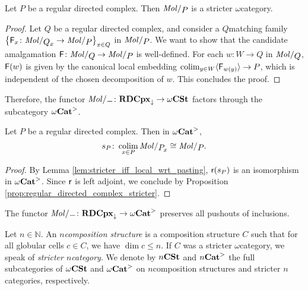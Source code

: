 \begin{prop} \label{prop:regular_directed_complex_stricter}
    Let \( P \) be a regular directed complex.
    Then \( \molecin{P} \) is a stricter \( \omega \)\nbd category.
\end{prop}
\begin{proof}
    Let \( Q \) be a regular directed complex, and consider a \( Q \)\nbd matching family \( \set{\F_x \colon \molecin{\imel{Q}{x}} \to \molecin{P}}_{x \in Q} \) in \( \molecin{P} \).
    We want to show that the candidate amalgamation \( \F \colon \molecin{Q} \to \molecin{P} \) is well-defined. 
    For each \( w \colon W \to Q \) in  \( \molecin{Q} \), \( \mathsf{F}(w) \) is given by the canonical local embedding \( \operatorname*{colim}_{y \in W} \langle\mathsf{F}_{w(y)}\rangle \to P \), which is independent of the chosen decomposition of \( w \).
    This concludes the proof.
\end{proof}

\noindent Therefore, the functor \( \molecin{-} \colon \rdcpxmap \to \Comp \) factors through the subcategory \( {\omega\mathbf{Cat}}^> \).

\begin{cor} \label{cor:regular_directed_complex_colimit_of_itself}
    Let \( P \) be a regular directed complex.
    Then in \( {\omega\mathbf{Cat}}^> \),
    \begin{equation*}
        s_P \colon \colim_{x \in P} \molecin{\imel{P}{x}} \cong \molecin{P}.
    \end{equation*}
\end{cor}
\begin{proof}
    By Lemma \ref{lem:stricter_iff_local_wrt_pasting}, \( \mathsf{r}(s_P) \) is an isomorphism in \( {\omega\mathbf{Cat}}^> \).
    Since \( \mathsf{r} \) is left adjoint, we conclude by Proposition \ref{prop:regular_directed_complex_stricter}.
\end{proof}

\begin{cor} \label{cor:molecin_preserves_pushout_inclusions}
    The functor \( \molecin{-} \colon \rdcpxmap \to \somegaCat \) preserves all pushouts of inclusions. 
\end{cor}

\begin{dfn} 
    Let \( n \in \mathbb{N} \).
    An \emph{\( n \)\nbd composition structure} is a composition structure \( C \) such that for all globular cells \( c \in C \), we have \( \dim c \le n \).
    If \( C \) was a stricter \( \omega \)\nbd category, we speak of \emph{stricter \( n \)\nbd category}.
    We denote by \( {n\mathbf{CSt}} \) and \( {n\mathbf{Cat}}^> \) the full subcategories of \( \omega\mathbf{CSt} \) and \( {\omega\mathbf{Cat}}^> \) on \( n \)\nbd composition structures and stricter \( n \)\nbd categories, respectively. 
\end{dfn}

